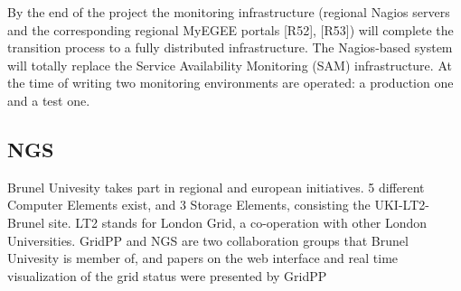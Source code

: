 By the end of the project the monitoring infrastructure (regional Nagios servers and the corresponding regional MyEGEE portals [R52], [R53]) will complete the transition process to a fully distributed infrastructure. The Nagios-based system will totally replace the Service Availability Monitoring (SAM) infrastructure. At the time of writing two monitoring environments are operated: a production one and a test one.


\subsection{NGS}
Brunel Univesity takes part in regional and european initiatives. 5 different Computer Elements exist, and 3 Storage Elements, consisting the UKI-LT2-Brunel site. LT2 stands for London Grid, a co-operation with other London Universities. GridPP and NGS are two collaboration groups that Brunel Univesity is member of, and papers on the web interface \cite{Hobson2007} and real time visualization of the grid status were presented \cite{Huang2007} by GridPP
